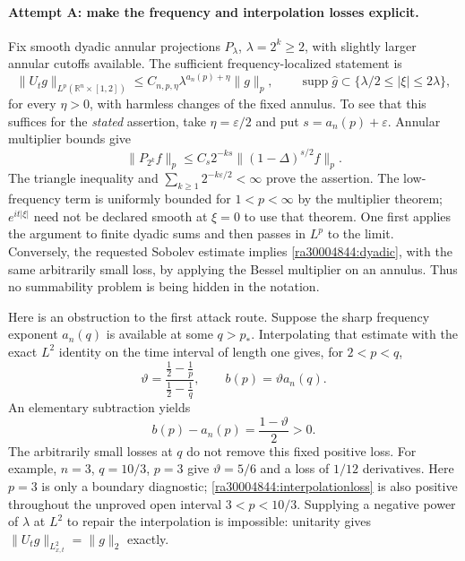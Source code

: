 \documentclass[11pt]{article}
\newcommand{\R}{\mathbb{R}}
\newcommand{\eps}{\varepsilon}
\begin{document}
	\paragraph{Attempt A: make the frequency and interpolation losses explicit.}
	Fix smooth dyadic annular projections $P_\lambda$, $\lambda=2^k\geq2$,
	with slightly larger annular cutoffs available. The sufficient
	frequency-localized statement is
	\begin{equation}\label{ra30004844:dyadic}
		\|U_t g\|_{L^p(\R^n\times[1,2])}
		\leq C_{n,p,\eta}\lambda^{a_n(p)+\eta}\|g\|_p,
		\qquad \operatorname{supp}\widehat g\subset
		\{\lambda/2\leq|\xi|\leq2\lambda\},
	\end{equation}
	for every $\eta>0$, with harmless changes of the fixed annulus. To see
	that this suffices for the \emph{stated} assertion, take
	$\eta=\eps/2$ and put $s=a_n(p)+\eps$. Annular multiplier bounds give
	\[
	\|P_{2^k}f\|_p\leq C_s2^{-ks}\|(1-\Delta)^{s/2}f\|_p.
	\]
	The triangle inequality and
	$\sum_{k\geq1}2^{-k\eps/2}<\infty$ prove the assertion. The low-frequency
	term is uniformly bounded for $1<p<\infty$ by the multiplier theorem;
	$e^{it|\xi|}$ need not be declared smooth at $\xi=0$ to use that theorem.
	One first applies the argument to finite dyadic sums and then passes in
	$L^p$ to the limit. Conversely, the requested Sobolev estimate implies
	\eqref{ra30004844:dyadic}, with the same arbitrarily small loss, by applying
	the Bessel multiplier on an annulus. Thus no summability problem is
	being hidden in the notation.
	
	Here is an obstruction to the first attack route. Suppose the sharp
	frequency exponent $a_n(q)$ is available at some $q>p_*$. Interpolating
	that estimate with the exact $L^2$ identity on the time interval of length
	one gives, for $2<p<q$,
	\[
	\vartheta=\frac{\frac12-\frac1p}{\frac12-\frac1q},\qquad
	b(p)=\vartheta a_n(q).
	\]
	An elementary subtraction yields
	\begin{equation}\label{ra30004844:interpolationloss}
		b(p)-a_n(p)=\frac{1-\vartheta}{2}>0.
	\end{equation}
	The arbitrarily small losses at $q$ do not remove this fixed positive
	loss. For example, $n=3$, $q=10/3$, $p=3$ give
	$\vartheta=5/6$ and a loss of $1/12$ derivatives. Here $p=3$ is only a
	boundary diagnostic; \eqref{ra30004844:interpolationloss} is also positive
	throughout the unproved open interval $3<p<10/3$. Supplying a negative
	power of $\lambda$ at $L^2$ to repair the interpolation is impossible:
	unitarity gives $\|U_tg\|_{L^2_{x,t}}=\|g\|_2$ exactly.
	
\end{document}
